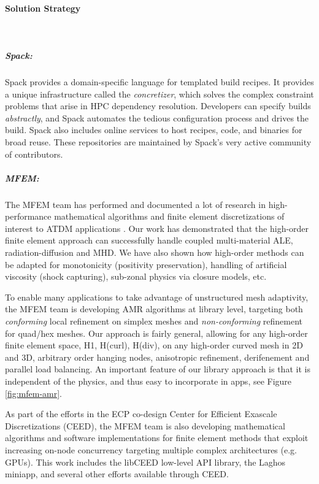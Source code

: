 \paragraph{Solution Strategy} \leavevmode \\

\subparagraph{Spack:}
Spack provides a domain-specific language for templated build recipes.
It provides a unique infrastructure called the {\it concretizer}, which
solves the complex constraint problems that arise in HPC dependency
resolution.  Developers can specify builds {\it abstractly}, and Spack
automates the tedious configuration process and drives the build. Spack
also includes online services to host recipes, code, and binaries for
broad reuse.  These repositories are maintained by Spack's very active
community of contributors.

\subparagraph{MFEM:}
The MFEM team has performed and documented a lot of research in
high-performance mathematical algorithms and finite element discretizations
of interest to ATDM applications
\cite{BLAST18,BLASTFCT18,BLASTFCT17,BLAST16,BLAST14,BLAST13,BLAST12,BLAST11}.
Our work has demonstrated that the high-order finite element approach can
successfully handle coupled multi-material ALE, radiation-diffusion and MHD.
We have also shown how high-order methods can be adapted for monotonicity
(positivity preservation), handling of artificial viscosity (shock capturing),
sub-zonal physics via closure models, etc.

To enable many applications to take advantage of unstructured mesh adaptivity,
the MFEM team is developing AMR algorithms at library level, targeting both
{\em conforming} local refinement on simplex meshes and {\em non-conforming}
refinement for quad/hex meshes. Our approach is fairly general, allowing for
any high-order finite element space, H1, H(curl), H(div), on any high-order
curved mesh in 2D and 3D, arbitrary order hanging nodes, anisotropic refinement,
derifenement and parallel load balancing.
An important feature of our library approach is that it is independent of
the physics, and thus easy to incorporate in apps, see Figure \ref{fig:mfem-amr}.

As part of the efforts in the ECP co-design Center for Efficient Exascale
Discretizations (CEED), the MFEM team is also developing mathematical algorithms
and software implementations for finite element methods that exploit increasing
on-node concurrency targeting multiple complex architectures (e.g. GPUs). This
work includes the libCEED low-level API library, the Laghos miniapp, and several
other efforts available through CEED.

